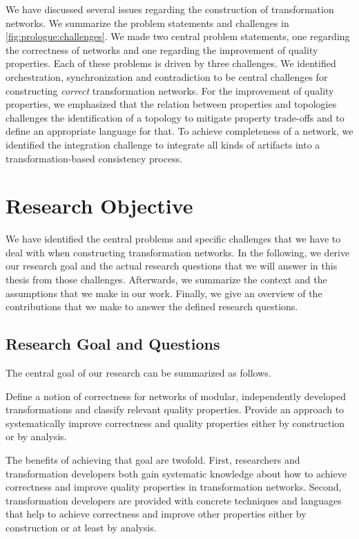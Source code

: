We have discussed several issues regarding the construction of transformation networks.
We summarize the problem statements and challenges in \autoref{fig:prologue:challenges}.
We made two central problem statements, one regarding the correctness of networks and one regarding the improvement of quality properties.
Each of these problems is driven by three challenges.
We identified orchestration, synchronization and contradiction to be central challenges for constructing \emph{correct} transformation networks.
For the improvement of quality properties, we emphasized that the relation between properties and topologies challenges the identification of a topology to mitigate property trade-offs and to define an appropriate language for that.
To achieve completeness of a network, we identified the integration challenge to integrate all kinds of artifacts into a transformation-based consistency process.



\section{Research Objective}

We have identified the central problems and specific challenges that we have to deal with when constructing transformation networks.
In the following, we derive our research goal and the actual research questions that we will answer in this thesis from those challenges.
Afterwards, we summarize the context and the assumptions that we make in our work.
Finally, we give an overview of the contributions that we make to answer the defined research questions.

\subsection{Research Goal and Questions}

The central goal of our research can be summarized as follows.
\begin{researchgoal}
Define a notion of correctness for networks of modular, independently developed transformations and classify relevant quality properties.
Provide an approach to systematically improve correctness and quality properties either by construction or by analysis.
\end{researchgoal}

The benefits of achieving that goal are twofold.
First, researchers and transformation developers both gain systematic knowledge about how to achieve correctness and improve quality properties in transformation networks.
Second, transformation developers are provided with concrete techniques and languages that help to achieve correctness and improve other properties either by construction or at least by analysis.


